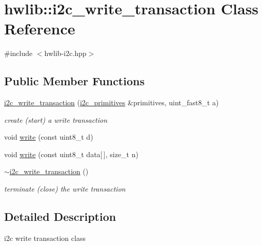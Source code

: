 \hypertarget{classhwlib_1_1i2c__write__transaction}{}\section{hwlib\+:\+:i2c\+\_\+write\+\_\+transaction Class Reference}
\label{classhwlib_1_1i2c__write__transaction}


{\ttfamily \#include $<$hwlib-\/i2c.\+hpp$>$}

\subsection*{Public Member Functions}
\begin{DoxyCompactItemize}
\item 
\mbox{\label{classhwlib_1_1i2c__write__transaction_a9238d0369f2249ea8de55383a0396db2}} 
\hyperlink{classhwlib_1_1i2c__write__transaction_a9238d0369f2249ea8de55383a0396db2}{i2c\+\_\+write\+\_\+transaction} (\hyperlink{classhwlib_1_1i2c__primitives}{i2c\+\_\+primitives} \&primitives, uint\+\_\+fast8\+\_\+t a)
\begin{DoxyCompactList}\small\item\em create (start) a write transaction \end{DoxyCompactList}\item 
void \hyperlink{classhwlib_1_1i2c__write__transaction_a15fdb954f92b784f2d723892b57f6728}{write} (const uint8\+\_\+t d)
\item 
void \hyperlink{classhwlib_1_1i2c__write__transaction_a518cffb445b15fc027d2689f17ef45e8}{write} (const uint8\+\_\+t data\mbox{[}$\,$\mbox{]}, size\+\_\+t n)
\item 
\mbox{\label{classhwlib_1_1i2c__write__transaction_a57a9e4a60bd32b521159b86898a842b7}} 
\hyperlink{classhwlib_1_1i2c__write__transaction_a57a9e4a60bd32b521159b86898a842b7}{$\sim$i2c\+\_\+write\+\_\+transaction} ()
\begin{DoxyCompactList}\small\item\em terminate (close) the write transaction \end{DoxyCompactList}\end{DoxyCompactItemize}


\subsection{Detailed Description}
i2c write transaction class

